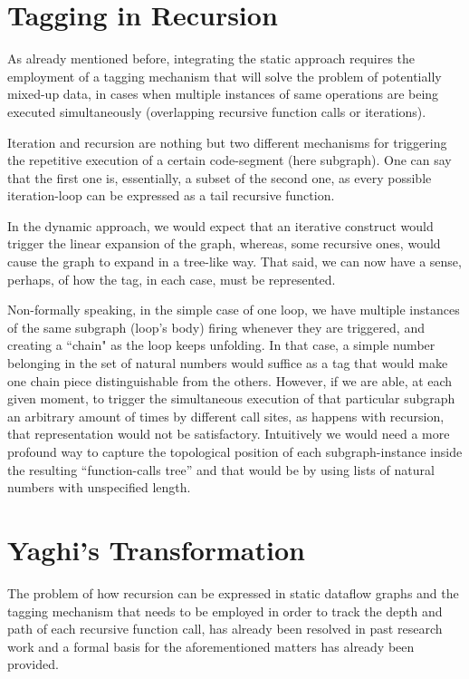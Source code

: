 \documentclass[ack,preface]{dithesis}
\begin{document}
    \section{Tagging in Recursion}

As already mentioned before, integrating the static approach requires the employment of a tagging mechanism that will solve the problem of potentially mixed-up data, in cases when multiple instances of same operations are being executed simultaneously (overlapping recursive function calls or iterations).

Iteration and recursion are nothing but two different mechanisms for triggering the repetitive execution of a certain code-segment (here subgraph). One can say that the first one is, essentially, a subset of the second one, as every possible iteration-loop can be expressed as a tail recursive function. 

In the dynamic approach, we would expect that an iterative construct would trigger the linear expansion of the graph, whereas, some recursive ones, would cause the graph to expand in a tree-like way. That said, we can now have a sense, perhaps, of how the tag, in each case, must be represented. 

Non-formally speaking, in the simple case of one  loop, we have multiple instances of the same subgraph (loop’s body) firing whenever they are triggered, and creating a ``chain" as the loop keeps unfolding. In that case, a simple number belonging in the set of natural numbers would suffice as a tag that would make one chain piece distinguishable from the others. However, if we are able, at each given moment, to trigger the simultaneous execution of that particular subgraph an arbitrary amount of times by different call sites, as happens with recursion, that representation would not be satisfactory. Intuitively we would need a more profound way to capture the topological position of each subgraph-instance inside the resulting “function-calls tree” and that would be by using lists of natural numbers with unspecified length.

    \section{Yaghi's Transformation}
The problem of how recursion can be expressed in static dataflow graphs and the tagging mechanism that needs to be employed in order to track the depth and path of each recursive function call, has already been resolved in past research work and a formal basis for the aforementioned matters has already been provided.  \cite{Rondogiannis:1997}
\end{document}
